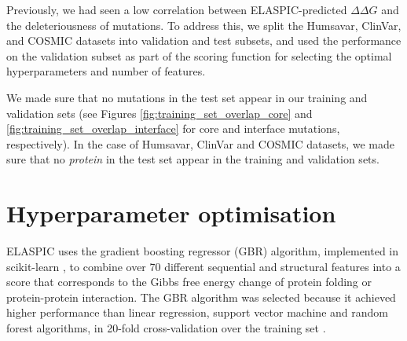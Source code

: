 Previously, we had seen a low correlation between ELASPIC-predicted $\Delta \Delta G$ and the deleteriousness of mutations. To address this, we split the Humsavar, ClinVar, and COSMIC datasets into validation and test subsets, and used the performance on the validation subset as part of the scoring function for selecting the optimal hyperparameters and number of features.

We made sure that no mutations in the test set appear in our training and validation sets (see Figures \ref{fig:training_set_overlap_core} and \ref{fig:training_set_overlap_interface} for core and interface mutations, respectively). In the case of Humsavar, ClinVar and COSMIC datasets, we made sure that no \textit{protein} in the test set appear in the training and validation sets.




\clearpage
\section{Hyperparameter optimisation}

ELASPIC uses the gradient boosting regressor (GBR) algorithm, implemented in scikit-learn \cite{scikit-learn}, to  combine over 70 different sequential and structural features into a score that corresponds to the Gibbs free energy change of protein folding or protein-protein interaction. The GBR algorithm was selected because it achieved higher performance than linear regression, support vector machine and random forest algorithms, in 20-fold cross-validation over the training set \cite{berliner_combining_2014}.

